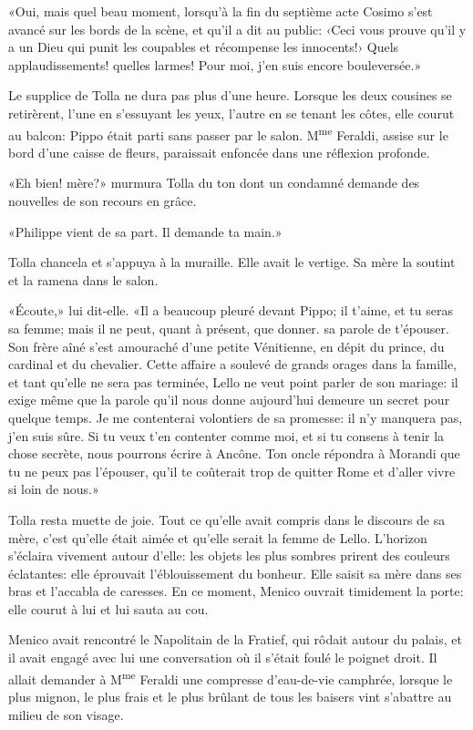 «Oui, mais quel beau moment, lorsqu'à la fin du septième acte Cosimo
s'est avancé sur les bords de la scène, et qu'il a dit au public: ‹Ceci
vous prouve qu'il y a un Dieu qui punit les coupables et récompense les
innocents!› Quels applaudissements! quelles larmes! Pour moi, j'en suis
encore bouleversée.»

Le supplice de Tolla ne dura pas plus d'une heure. Lorsque les deux
cousines se retirèrent, l'une en s'essuyant les yeux, l'autre en se
tenant les côtes, elle courut au balcon: Pippo était parti sans passer
par le salon. M\textsuperscript{me} Feraldi, assise sur le bord d'une
caisse de fleurs, paraissait enfoncée dans une réflexion profonde.

«Eh bien! mère?» murmura Tolla du ton dont un condamné demande des
nouvelles de son recours en grâce.

«Philippe vient de sa part. Il demande ta main.»

Tolla chancela et s'appuya à la muraille. Elle avait le vertige. Sa mère
la soutint et la ramena dans le salon.

«Écoute,» lui dit-elle. «Il a beaucoup pleuré devant Pippo; il t'aime,
et tu seras sa femme; mais il ne peut, quant à présent, que donner. sa
parole de t'épouser. Son frère aîné s'est amouraché d'une petite
Vénitienne, en dépit du prince, du cardinal et du chevalier. Cette
affaire a soulevé de grands orages dans la famille, et tant qu'elle ne
sera pas terminée, Lello ne veut point parler de son mariage: il exige
même que la parole qu'il nous donne aujourd'hui demeure un secret pour
quelque temps. Je me contenterai volontiers de sa promesse: il n'y
manquera pas, j'en suis sûre. Si tu veux t'en contenter comme moi, et si
tu consens à tenir la chose secrète, nous pourrons écrire à Ancône. Ton
oncle répondra à Morandi que tu ne peux pas l'épouser, qu'il te
coûterait trop de quitter Rome et d'aller vivre si loin de nous.»

Tolla resta muette de joie. Tout ce qu'elle avait compris dans le
discours de sa mère, c'est qu'elle était aimée et qu'elle serait la
femme de Lello. L'horizon s'éclaira vivement autour d'elle: les objets
les plus sombres prirent des couleurs éclatantes: elle éprouvait
l'éblouissement du bonheur. Elle saisit sa mère dans ses bras et
l'accabla de caresses. En ce moment, Menico ouvrait timidement la porte:
elle courut à lui et lui sauta au cou.

Menico avait rencontré le Napolitain de la Fratief, qui rôdait autour du
palais, et il avait engagé avec lui une conversation où il s'était foulé
le poignet droit. Il allait demander à M\textsuperscript{me} Feraldi une
compresse d'eau-de-vie camphrée, lorsque le plus mignon, le plus frais
et le plus brûlant de tous les baisers vint s'abattre au milieu de son
visage.

